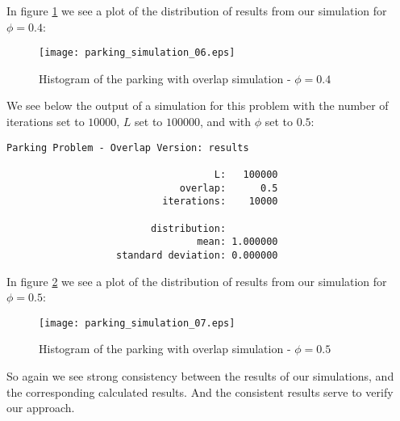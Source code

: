 In figure \ref{fig:ps6} we see a plot of the distribution 
of results from our simulation for $\phi = 0.4$: \bigskip

\begin{figure}[h!]
	\centering
	\texttt{[image: parking\_simulation\_06.eps]}
	\caption{Histogram of the parking with overlap simulation - $\phi = 0.4$}
	\label{fig:ps6}
\end{figure}\medskip

\newpage

We see below the output of a simulation for this 
problem with the number of iterations set to $10000$, 
$L$ set to $100000$, and with $\phi$ set to $0.5$: \bigskip

	\begin{lstlisting}[numbers=none]
    Parking Problem - Overlap Version: results

                                    L:   100000
                              overlap:      0.5
                           iterations:    10000

                         distribution:
                                 mean: 1.000000
                   standard deviation: 0.000000

	\end{lstlisting} \bigskip

In figure \ref{fig:ps7} we see a plot of the distribution 
of results from our simulation for $\phi = 0.5$: \bigskip

\begin{figure}[h!]
	\centering
	\texttt{[image: parking\_simulation\_07.eps]}
	\caption{Histogram of the parking with overlap simulation - $\phi = 0.5$}
	\label{fig:ps7}
\end{figure}\medskip

\newpage

So again we see strong consistency between the results 
of our simulations, and the corresponding calculated results. 
And the consistent results serve to verify our approach. \bigskip
















